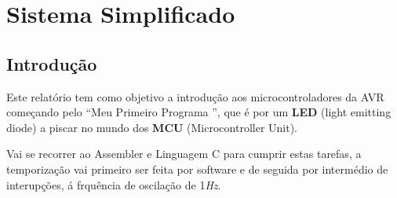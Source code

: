 \documentclass[titlepage, a4paper, 10pt, reqno, openany]{report}
\begin{document}
\renewcommand\thesection{\arabic{section}}
\renewcommand\thesubsection{\thesection.\arabic{subsection}}
\renewcommand\thesubsubsection{\thesection.\thesubsection.\arabic{subsubsection}}
\pagestyle{plain}%
	\chapter*{Sistema Simplificado}
	\section{Introdu\c{c}\~{a}o}
	Este relat\'{o}rio tem como objetivo a introdu\c{c}\~{a}o aos microcontroladores da AVR come\c{c}ando pelo \textquotedblleft Meu Primeiro Programa \textquotedblright, que \'{e} por um {\bf LED} (light emitting diode) a piscar no mundo dos {\bf MCU} (Microcontroller Unit). \par
	Vai se recorrer ao Assembler e Linguagem C para cumprir estas tarefas, a temporiza\c{c}\~{a}o vai primeiro ser feita por software e de seguida por interm\'{e}dio de interup\c{c}\~{o}es, \'{a} frqu\^{e}ncia de oscila\c{c}\~{a}o de 1{\it Hz}.
\end{document}

